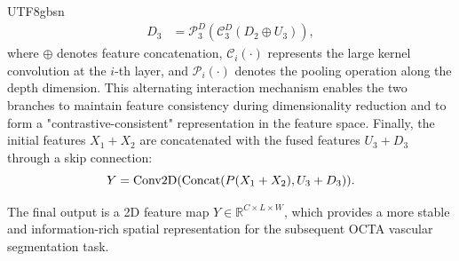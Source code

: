 \documentclass[times, review, 10pt]{elsarticle}
\begin{document}
\begin{CJK}{UTF8}{gbsn}
\begin{equation}
\begin{split}
D_{3}&=\mathcal{P}_{3}^{D}\left(\mathcal{C}_{3}^{D}\left(D_{2} \oplus U_{3}\right)\right),
\end{split}
\end{equation}
where $\oplus$ denotes feature concatenation, $\mathcal{C}_i(\cdot)$ represents the large kernel convolution at the $i$-th layer, and $\mathcal{P}_i(\cdot)$ denotes the pooling operation along the depth dimension. This alternating interaction mechanism enables the two branches to maintain feature consistency during dimensionality reduction and to form a "contrastive-consistent" representation in the feature space. Finally, the initial features $X_1 + X_2$ are concatenated with the fused features $U_3 + D_3$ through a skip connection:
\begin{equation}
Y={\rm Conv2D}({\rm Concat}(P(X_1+X_2),U_3+D_3)).
\end{equation}\par
The final output is a 2D feature map $Y \in \mathbb{R}^{C \times L \times W}$, which provides a more stable and information-rich spatial representation for the subsequent OCTA vascular segmentation task.

\end{CJK}
\end{document}
